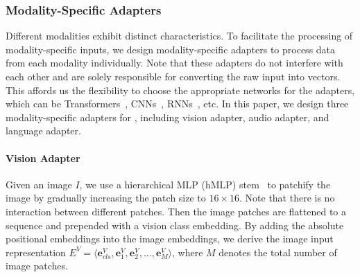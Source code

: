 \subsubsection{Modality-Specific Adapters}

Different modalities exhibit distinct characteristics.
To facilitate the processing of modality-specific inputs, we design modality-specific adapters to process data from each modality individually.
Note that these adapters do not interfere with each other and are solely responsible for converting the raw input into vectors.
This affords us the flexibility to choose the appropriate networks for the adapters, which can be Transformers~\cite{transformer,vit,swin}, CNNs~\cite{cnn,resnet}, RNNs~\cite{rnn,gru,lstm}, etc.
In this paper, we design three modality-specific adapters for \onepeace, including vision adapter, audio adapter, and language adapter.

\paragraph{Vision Adapter}
Given an image $I$, we use a hierarchical MLP (hMLP) stem~\cite{Touvron2022ThreeTE} to patchify the image by gradually increasing the patch size to $16 \times 16$. Note that there is no interaction between different patches. Then the image patches are flattened to a sequence and prepended with a vision class embedding. By adding the absolute positional embeddings into the image embeddings, we derive the image input representation $E^V=\langle \bm{e}^V_{cls}, \bm{e}^V_{1}, \bm{e}^V_{2}, ..., \bm{e}^V_{M} \rangle$, where $M$ denotes the total number of image patches.

